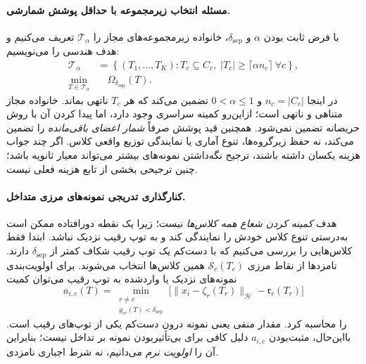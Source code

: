 \paragraph{مسئله انتخاب زیرمجموعه با حداقل پوشش شمارشی.}
با فرض ثابت بودن
$\alpha$ و $\delta_{\mathrm{sep}}$،
خانواده زیرمجموعه‌های مجاز را
$\mathcal T_\alpha$ تعریف
می‌کنیم و هدف هندسی را می‌نویسیم:
\begin{equation}\label{eq:ch3-outlier-js-subset-problem}
\boxed{
\begin{aligned}
\mathcal T_\alpha
&=\left\{(T_1,\ldots,T_K):
 T_c\subseteq C_c,\;
 |T_c|\ge\lceil\alpha n_c\rceil
 \ \forall c\right\},\\
\min_{T\in\mathcal T_\alpha}
&\quad\Omega_{\delta_{\mathrm{sep}}}(T).
\end{aligned}}
\end{equation}
در اینجا $n_c=|C_c|$ و
$0<\alpha\le1$ تضمین می‌کند
که هر $T_c$ ناتهی بماند.
خانواده مجاز متناهی و ناتهی
است؛ ازاین‌رو کمینه سراسری
وجود دارد، اما پیدا کردن
آن با روش حریصانه تضمین
نمی‌شود. همچنین قید پوشش
صرفاً \emph{شمار اعضای
باقی‌مانده} را تضمین
می‌کند، نه حفظ زیرگروه‌ها،
تنوع آماری یا نمایندگی
توزیع واقعی کلاس.
اگر چند جواب هزینه یکسان
داشته باشند، ترجیح نگه‌داشتن
نمونه‌های بیشتر می‌تواند
معیار ثانویه باشد؛ چنین
ترجیحی بخشی از تابع هزینه
فعلی نیست.

\paragraph{کنارگذاری تدریجی نمونه‌های مرزی متداخل.}
هدف \emph{کمینه کردن شعاع همه کلاس‌ها}
نیست؛ زیرا یک نقطه دورافتاده
ممکن است به‌درستی تنوع کلاس خودش
را نمایندگی کند و به توپ رقیب
نزدیک نباشد. ابتدا فقط کلاس‌هایی
را بررسی می‌کنیم که با دست‌کم
یک توپ رقیب شکاف کمتر از
$\delta_{\mathrm{sep}}$ دارند.
نامزدها از نقاط مرزی
$\mathcal S_c(T_c)$ همین کلاس‌ها
انتخاب می‌شوند. برای اولویت‌بندی
نمونه‌های نزدیک یا واردشده به
توپ رقیب می‌توان کمیت
\begin{equation}\label{eq:ch3-outlier-js-rival-intrusion}
a_{i,c}(T)=
\min_{\substack{r\ne c\\g_{cr}(T)<\delta_{\mathrm{sep}}}}
\bigl[
\|x_i-\zeta_r(T_r)\|_{\mathcal H}
-\mathfrak r_r(T_r)
\bigr]
\end{equation}
را محاسبه کرد.
مقدار منفی یعنی نمونه درون
دست‌کم یکی از توپ‌های رقیب است.
بااین‌حال، مثبت‌بودن $a_{i,c}$
دلیل کافی برای بی‌تأثیربودن
نمونه بر تداخل نیست؛ بنابراین
آن را \emph{اولویت نرم} می‌دانیم،
نه شرط اجباری نامزدی.

